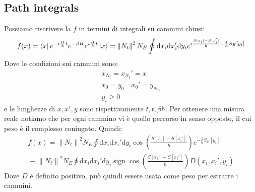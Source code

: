 \documentclass[italian]{article}
\DeclareMathOperator{\sign}{sign}
\begin{document}
	\subsection{Path integrals}
	Possiamo riscrivere la $f$ in termini di integrali su cammini chiusi:
	\begin{equation}
		f(x) = \bra{x}e^{-i\frac{H}{\hbar}t}
		e^{-\beta\tilde{H}}
		e^{i\frac{H}{\hbar}t}\ket{x} =
		 \left\|N_t\right\|^2N_E \oint \mathrm{d}x_i\mathrm{d}x_i'\mathrm{d}y_i 
		e^{i\frac{S[x_i]-S[x_i']}{\hbar} - \frac{1}{\hbar}S_E[y_i]}
	\end{equation}
	Dove le condizioni sui cammini sono:
	\begin{align}
		x_{N_t} = x_{N_t}' = x \\
		x_0 = y_0 \quad x_0' = y_{N_E} \\
		y_i \ge 0
	\end{align}
	e le lunghezze di $x, x', y$ sono rispettivamente $t, t, \beta\hbar$.
	Per ottenere una misura reale notiamo che per ogni cammino vi è quello percorso in senso opposto, il cui peso è il complesso coniugato. Quindi:
	\begin{align}
	f(x) =  \left\|N_t\right\|^2N_E \oint \mathrm{d}x_i\mathrm{d}x_i'\mathrm{d}y_i 
	\cos\left(\frac{S[x_i]-S[x_i']}{\hbar}\right) e^{-\frac{1}{\hbar}S_E[y_i]} \\ \equiv 
	\left\|N_t\right\|^2N_E \oint \mathrm{d}x_i\mathrm{d}x_i'\mathrm{d}y_i 
	\sign \cos\left(\frac{S[x_i]-S[x_i']}{\hbar}\right) D(x_i, x_i',y_i)
	\end{align}
	Dove $D$ è definito positivo, può quindi essere usata come peso per estrarre i cammini.
\end{document}
